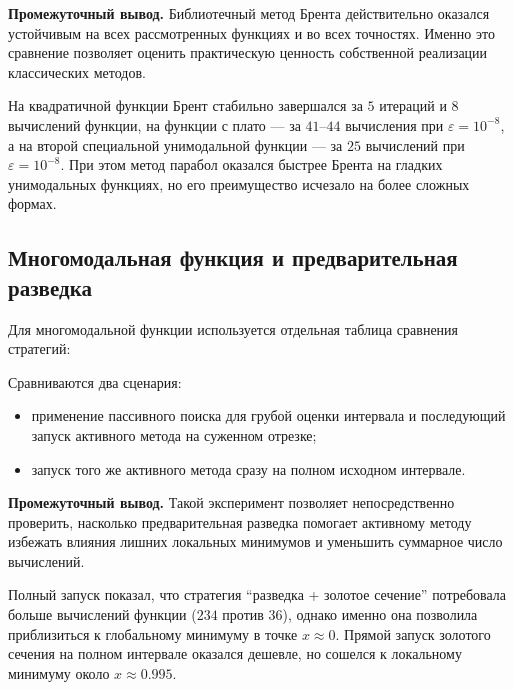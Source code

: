 \documentclass[14pt,a4paper]{extarticle}
\begin{document}
\textbf{Промежуточный вывод.} Библиотечный метод Брента действительно оказался устойчивым на всех рассмотренных функциях и во всех точностях. Именно это сравнение позволяет оценить практическую ценность собственной реализации классических методов.

На квадратичной функции Брент стабильно завершался за $5$ итераций и $8$ вычислений функции, на функции с плато --- за $41$--$44$ вычисления при $\varepsilon = 10^{-8}$, а на второй специальной унимодальной функции --- за $25$ вычислений при $\varepsilon = 10^{-8}$. При этом метод парабол оказался быстрее Брента на гладких унимодальных функциях, но его преимущество исчезало на более сложных формах.

\subsection{Многомодальная функция и предварительная разведка}

Для многомодальной функции используется отдельная таблица сравнения стратегий:
\begin{center}
\end{center}

Сравниваются два сценария:
\begin{itemize}
    \item применение пассивного поиска для грубой оценки интервала и последующий запуск активного метода на суженном отрезке;
    \item запуск того же активного метода сразу на полном исходном интервале.
\end{itemize}

\textbf{Промежуточный вывод.} Такой эксперимент позволяет непосредственно проверить, насколько предварительная разведка помогает активному методу избежать влияния лишних локальных минимумов и уменьшить суммарное число вычислений.

Полный запуск показал, что стратегия ``разведка + золотое сечение'' потребовала больше вычислений функции ($234$ против $36$), однако именно она позволила приблизиться к глобальному минимуму в точке $x \approx 0$. Прямой запуск золотого сечения на полном интервале оказался дешевле, но сошелся к локальному минимуму около $x \approx 0.995$.
\end{document}
